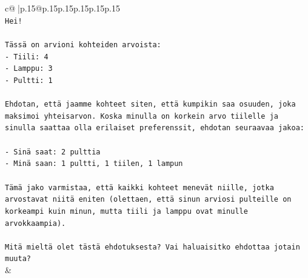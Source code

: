 \documentclass{article}
\begin{document}
{\begin{supertabular}{c@{$\;$}|p{.15\linewidth}@{}p{.15\linewidth}p{.15\linewidth}p{.15\linewidth}p{.15\linewidth}p{.15\linewidth}}
{{{\\ 
\texttt{Hei!} \\
\\ 
\texttt{Tässä on arvioni kohteiden arvoista:} \\
\texttt{{-} Tiili: 4} \\
\texttt{{-} Lamppu: 3} \\
\texttt{{-} Pultti: 1} \\
\\ 
\texttt{Ehdotan, että jaamme kohteet siten, että kumpikin saa osuuden, joka maksimoi yhteisarvon. Koska minulla on korkein arvo tiilelle ja sinulla saattaa olla erilaiset preferenssit, ehdotan seuraavaa jakoa:} \\
\\ 
\texttt{{-} Sinä saat: 2 pulttia} \\
\texttt{{-} Minä saan: 1 pultti, 1 tiilen, 1 lampun} \\
\\ 
\texttt{Tämä jako varmistaa, että kaikki kohteet menevät niille, jotka arvostavat niitä eniten (olettaen, että sinun arviosi pulteille on korkeampi kuin minun, mutta tiili ja lamppu ovat minulle arvokkaampia).} \\
\\ 
\texttt{Mitä mieltä olet tästä ehdotuksesta? Vai haluaisitko ehdottaa jotain muuta?} \\
            }
        }
    }
    & \\ \\


\end{supertabular}}
\end{document}

